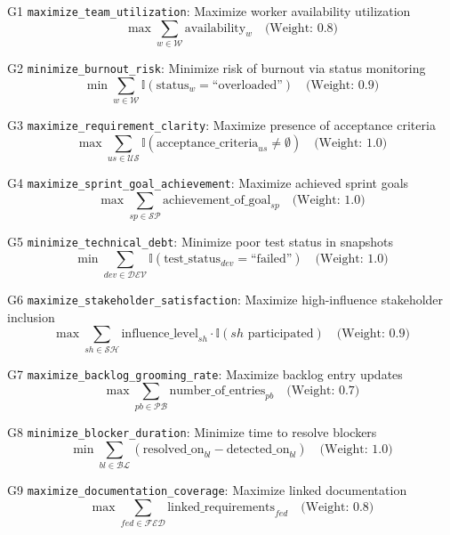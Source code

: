 \documentclass[12pt]{article}
\begin{document}
    \item[G1] \texttt{maximize\_team\_utilization}: Maximize worker availability utilization
    \[
    \max \sum_{w \in \mathcal{W}} \text{availability}_w \quad \text{(Weight: 0.8)}
    \]

    \item[G2] \texttt{minimize\_burnout\_risk}: Minimize risk of burnout via status monitoring
    \[
    \min \sum_{w \in \mathcal{W}} \mathbb{I}(\text{status}_w = \text{``overloaded''}) \quad \text{(Weight: 0.9)}
    \]

    \item[G3] \texttt{maximize\_requirement\_clarity}: Maximize presence of acceptance criteria
    \[
    \max \sum_{us \in \mathcal{US}} \mathbb{I}(\text{acceptance\_criteria}_{us} \neq \emptyset) \quad \text{(Weight: 1.0)}
    \]

    \item[G4] \texttt{maximize\_sprint\_goal\_achievement}: Maximize achieved sprint goals
    \[
    \max \sum_{sp \in \mathcal{SP}} \text{achievement\_of\_goal}_{sp} \quad \text{(Weight: 1.0)}
    \]

    \item[G5] \texttt{minimize\_technical\_debt}: Minimize poor test status in snapshots
    \[
    \min \sum_{dev \in \mathcal{DEV}} \mathbb{I}(\text{test\_status}_{dev} = \text{``failed''}) \quad \text{(Weight: 1.0)}
    \]

    \item[G6] \texttt{maximize\_stakeholder\_satisfaction}: Maximize high-influence stakeholder inclusion
    \[
    \max \sum_{sh \in \mathcal{SH}} \text{influence\_level}_{sh} \cdot \mathbb{I}(sh \text{ participated}) \quad \text{(Weight: 0.9)}
    \]

    \item[G7] \texttt{maximize\_backlog\_grooming\_rate}: Maximize backlog entry updates
    \[
    \max \sum_{pb \in \mathcal{PB}} \text{number\_of\_entries}_{pb} \quad \text{(Weight: 0.7)}
    \]

    \item[G8] \texttt{minimize\_blocker\_duration}: Minimize time to resolve blockers
    \[
    \min \sum_{bl \in \mathcal{BL}} (\text{resolved\_on}_{bl} - \text{detected\_on}_{bl}) \quad \text{(Weight: 1.0)}
    \]

    \item[G9] \texttt{maximize\_documentation\_coverage}: Maximize linked documentation
    \[
    \max \sum_{fed \in \mathcal{FED}} \text{linked\_requirements}_{fed} \quad \text{(Weight: 0.8)}
    \]
\end{document}
